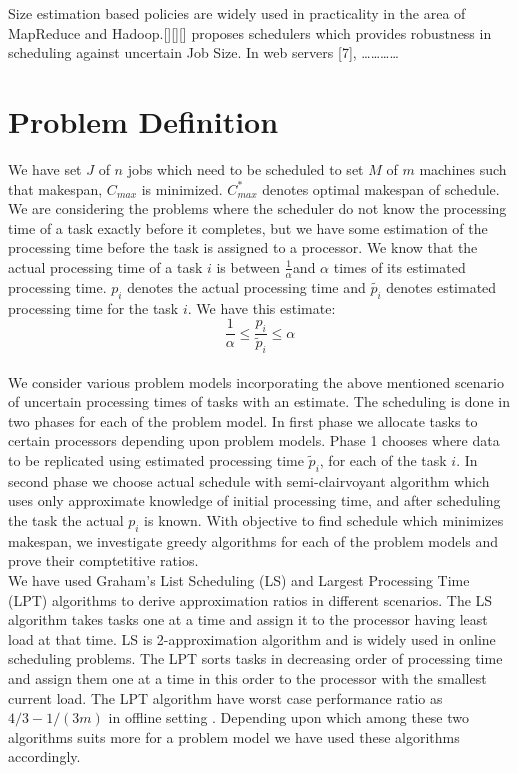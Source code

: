\documentclass[10pt, conference, compsocconf]{IEEEtran}
\begin{document}
Size estimation based policies are widely used in practicality in the area of MapReduce and Hadoop.[][][] proposes schedulers which provides robustness in scheduling against uncertain Job Size.  In web servers [7], ………… 




\section{Problem Definition}
We have set $J$ of $n$ jobs which need to be scheduled to set $M$ of $m$ machines such that makespan, $C_{max}$ is minimized.   $C_{max}^{*}$ denotes optimal makespan of schedule.   We are considering the problems where the scheduler do not know the processing time of a task exactly before it completes, but we have some estimation of the processing time before the task is assigned to a processor. We know that the actual processing time of a task $i$ is between $\frac{1}{\alpha}$and $\alpha$ times of its estimated processing time. $p_i$ denotes the actual processing time and $\tilde {p_i}$ denotes
estimated processing time for the task $i$.  We have this estimate:\\
\begin{equation} 
\frac{1}{\alpha}\leq \frac{p_{i}}{\tilde{p}_{i}}\leq \alpha
\end{equation}\\


We consider various problem models  incorporating the above mentioned scenario of uncertain processing times of tasks with an estimate. The scheduling is done in two phases for each of the problem model.  In first phase we allocate tasks to certain processors depending upon problem models.  Phase 1 chooses where data to be  replicated using estimated processing time $\tilde p_i $, for each of the task $i$.  In second phase we choose actual schedule with semi-clairvoyant algorithm which uses only approximate knowledge of initial processing time, and after scheduling the task the actual $p_i$ is known.  With  objective to find schedule which minimizes makespan, we investigate greedy algorithms for each of the problem models and prove their comptetitive ratios. \\

We have used  Graham's List Scheduling (LS) and Largest Processing Time (LPT) algorithms to derive approximation ratios in different scenarios. The LS algorithm takes tasks one at a time and assign  it to the processor having least load at that time. LS is 2-approximation algorithm and is widely used in online scheduling problems.  The LPT sorts tasks in decreasing order of processing time and assign them one at a time in this order to the processor with the smallest current load. The LPT algorithm have worst case performance ratio as $4/3-1/(3m) $ in offline setting
. Depending upon which among these two algorithms suits more for a problem model we have used these algorithms accordingly. 
\end{document}
